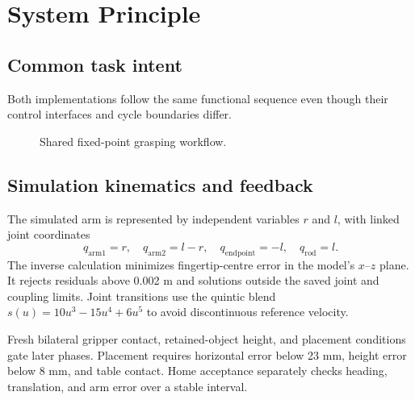 \documentclass[9pt,a4paper,twocolumn,twoside]{tau-class/tau}
\begin{document}
\section{System Principle}

\subsection{Common task intent}
Both implementations follow the same functional sequence even though their
control interfaces and cycle boundaries differ.

\begin{figure}[t]
\centering
{}
\caption{Shared fixed-point grasping workflow.}
\label{fig:workflow}
\end{figure}

\subsection{Simulation kinematics and feedback}
The simulated arm is represented by independent variables $r$ and $l$, with
linked joint coordinates
\begin{equation}
q_{\mathrm{arm1}}=r,\quad q_{\mathrm{arm2}}=l-r,\quad
q_{\mathrm{endpoint}}=-l,\quad q_{\mathrm{rod}}=l.
\end{equation}
The inverse calculation minimizes fingertip-centre error in the model's
$x$--$z$ plane. It rejects residuals above 0.002 m and solutions outside the
saved joint and coupling limits. Joint transitions use the quintic blend
$s(u)=10u^3-15u^4+6u^5$ to avoid discontinuous reference velocity.

Fresh bilateral gripper contact, retained-object height, and placement
conditions gate later phases. Placement requires horizontal error below 23 mm,
height error below 8 mm, and table contact. Home acceptance separately checks
heading, translation, and arm error over a stable interval.
\end{document}
